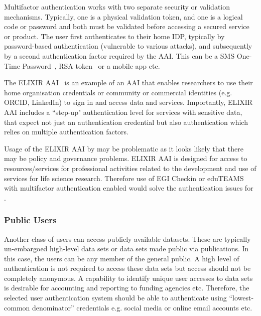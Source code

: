 \documentclass[12pt,a4paper]{article}
\begin{document}
Multifactor authentication works with two separate security or validation mechanisms. 
Typically, one is a physical validation token, and one is a logical code or password and both must be validated before accessing a secured service or product.
The user first authenticates to their home IDP, typically by password-based authentication (vulnerable to various attacks), and subsequently by a second authentication factor required by the AAI.
This can be a SMS One-Time Password~\cite{otp}, RSA token~\cite{rsa-token} or a mobile app etc.

The ELIXIR AAI~\cite{elixir-aai} is an example of an AAI that enables researchers to use their home organisation credentials or community or commercial identities (e.g. ORCID, LinkedIn) to sign in and access data and services.
Importantly, ELIXIR AAI includes a ``step-up" authentication level for services with sensitive data, that expect not just an authentication credential but also authentication which relies on multiple authentication factors.

Usage of the ELIXIR AAI by \ED may be problematic as it looks likely that there may be policy and governance problems.
ELIXIR AAI is designed for access to resources/services for professional activities related to the development and use of services for life science research.
Therefore use of EGI Checkin or eduTEAMS with multifactor authentication enabled would solve the authentication issues for \ED.

\subsubsection{Public Users} \label{ssec:public}

Another class of users can access publicly available datasets.
These are typically un-embargoed high-level data sets or data sets made public via publications.
In this case, the users can be any member of the general public.
A high level of authentication is not required to access these data sets but access should not be completely anonymous.
A capability to identify unique user accesses to data sets is desirable for accounting and reporting to funding agencies etc.
Therefore, the selected user authentication system should be able to authenticate using ``lowest-common denominator'' credentials e.g. social media or online email accounts etc.

% 



\newpage
{}

\end{document}
